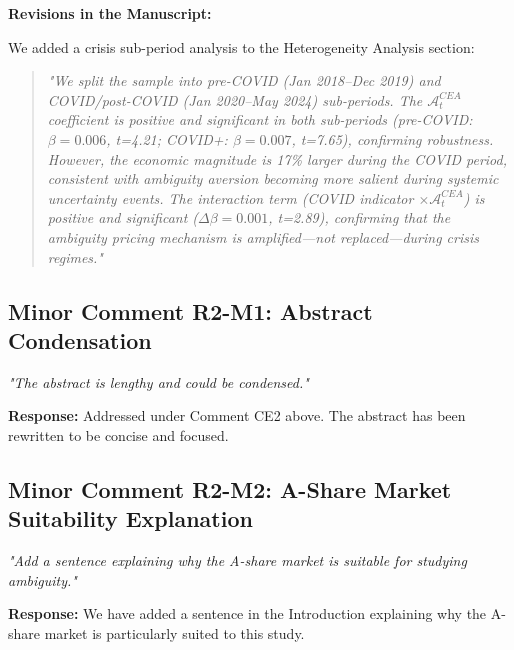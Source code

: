 \documentclass[12pt]{article}
\begin{document}
\begin{highlightbox}
\textbf{Revisions in the Manuscript:}

We added a crisis sub-period analysis to the Heterogeneity Analysis section:
\vspace{0.2cm}
\begin{quote}
\itshape "We split the sample into pre-COVID (Jan 2018--Dec 2019) and COVID/post-COVID (Jan 2020--May 2024) sub-periods. The $\mathcal{A}^{CEA}_t$ coefficient is positive and significant in both sub-periods (pre-COVID: $\beta=0.006$, t=4.21; COVID+: $\beta=0.007$, t=7.65), confirming robustness. However, the economic magnitude is 17\% larger during the COVID period, consistent with ambiguity aversion becoming more salient during systemic uncertainty events. The interaction term (COVID indicator $\times \mathcal{A}^{CEA}_t$) is positive and significant ($\Delta\beta=0.001$, t=2.89), confirming that the ambiguity pricing mechanism is amplified---not replaced---during crisis regimes."
\end{quote}
\end{highlightbox}

\subsection*{Minor Comment R2-M1: Abstract Condensation}
\textit{"The abstract is lengthy and could be condensed."}

\begin{highlightbox}
\textbf{Response:} Addressed under Comment CE2 above. The abstract has been rewritten to be concise and focused.
\end{highlightbox}

\subsection*{Minor Comment R2-M2: A-Share Market Suitability Explanation}
\textit{"Add a sentence explaining why the A-share market is suitable for studying ambiguity."}

\begin{highlightbox}
\textbf{Response:} We have added a sentence in the Introduction explaining why the A-share market is particularly suited to this study.
\end{highlightbox}
\end{document}

